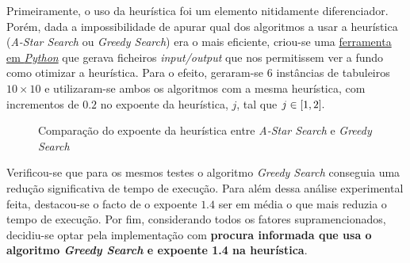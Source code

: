 \documentclass[12pt]{exam}
\renewcommand\_{\textunderscore\linebreak[1]}
\begin{document}
        \indent Primeiramente, o uso da heurística foi um elemento nitidamente diferenciador. Porém, dada a impossibilidade de apurar qual dos algoritmos a usar a heurística (\textit{A-Star Search} ou \textit{Greedy Search}) era o mais eficiente, criou-se uma \href{https://github.com/ImGugz/IA2122/blob/main/src/generator.py}{ferramenta em \textit{Python}} que gerava ficheiros \textit{input/output} que nos permitissem ver a fundo como otimizar a heurística. Para o efeito, geraram-se 6 instâncias de tabuleiros $10 \times 10$ e utilizaram-se ambos os algoritmos com a mesma heurística, com incrementos de $0.2$ no expoente da heurística, $j$, tal que $j \in \interval{1}{2}.$
        \vspace{-4.5mm}
        \begin{figure}[ht!]
        \centering
        \qquad
        \caption{Comparação do expoente da heurística entre \textit{A-Star Search} e \textit{Greedy Search}}%
        \label{fig:example}%
        \end{figure}

        \indent Verificou-se que para os mesmos testes o algoritmo \textit{Greedy Search} conseguia uma redução significativa de tempo de execução. Para além dessa análise experimental feita, destacou-se o facto de o expoente $1.4$ ser em média o que mais reduzia o tempo de execução. Por fim, considerando todos os fatores supramencionados, decidiu-se optar pela implementação com \textbf{procura informada que usa o algoritmo \textit{Greedy Search} e expoente 1.4 na heurística}.
\end{document}
